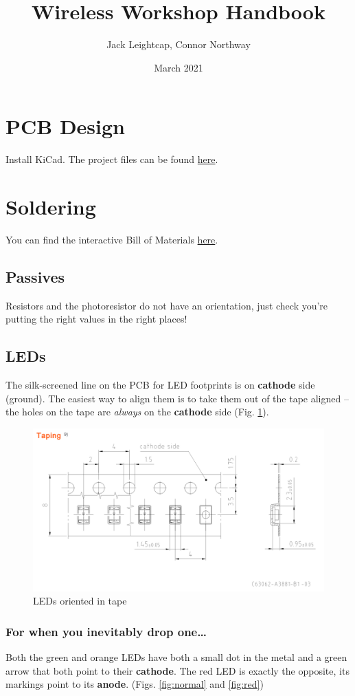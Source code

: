 \documentclass{article}
\title{Wireless Workshop Handbook}
\author{Jack Leightcap, Connor Northway}
\date{March 2021}
\begin{document}
\maketitle

\section{PCB Design}
Install KiCad. The project files can be found \href{https://github.com/cnorthway/d1-sensor-shield}{here}.

\section{Soldering}
You can find the interactive Bill of Materials \href{http://www1.coe.neu.edu/~cnorthwa/ibom.html}{here}.

\subsection{Passives}
Resistors and the photoresistor do not have an orientation, just check you're putting the right values in the right places!

\subsection{LEDs}
The silk-screened line on the PCB for LED footprints is on \textbf{cathode} side (ground).
The easiest way to align them is to take them out of the tape aligned -- the holes on the tape are \emph{always} on the \textbf{cathode} side (Fig. \ref{fig:ledtape}).
\begin{figure}[H]
	\centering
	\includegraphics[width=12cm]{ledtape.png}
	\caption{LEDs oriented in tape}
	\label{fig:ledtape}
\end{figure}

\subsubsection{For when you inevitably drop one\ldots}
Both the green and orange LEDs have both a small dot in the metal and a green arrow that both point to their \textbf{cathode}.
The red LED is exactly the opposite, its markings point to its \textbf{anode}.
(Figs. \ref{fig:normal} and \ref{fig:red})
\end{document}
